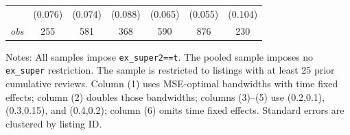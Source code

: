 \begin{table}[!htbp]
\begin{tabular}{lcccccc}
 & (0.076) & (0.074) & (0.088) & (0.065) & (0.055) & (0.104) \\
\textit{obs} & 255 & 581 & 368 & 590 & 876 & 230 \\
\bottomrule
\end{tabular}
\begin{minipage}{0.98\textwidth}\footnotesize
Notes: All samples impose \texttt{ex\_super2==t}. The pooled sample imposes no \texttt{ex\_super} restriction. The sample is restricted to listings with at least 25 prior cumulative reviews. Column (1) uses MSE-optimal bandwidths with time fixed effects; column (2) doubles those bandwidths; columns (3)--(5) use (0.2,0.1), (0.3,0.15), and (0.4,0.2); column (6) omits time fixed effects. Standard errors are clustered by listing ID.
\end{minipage}
\end{table}
